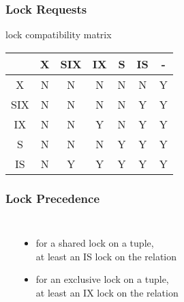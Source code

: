 \documentclass[dvipsnames]{beamer}
\theoremstyle{plain}
\begin{document}
\begin{frame}
  \frametitle{Lock Requests}

  \begin{block}{lock compatibility matrix}
    \begin{table}
      \begin{tabular}{|c||c|c|c|c|c|c|}\hline
    & X & SIX & IX & S & IS & -\\\hline\hline
  X & N &  N  & N  & N & N  & Y\\\hline
SIX & N &  N  & N  & N & Y  & Y\\\hline
 IX & N &  N  & Y  & N & Y  & Y\\\hline
  S & N &  N  & N  & Y & Y  & Y\\\hline
 IS & N &  Y  & Y  & Y & Y  & Y\\\hline
      \end{tabular}
    \end{table}
  \end{block}
\end{frame}

\begin{frame}
  \frametitle{Lock Precedence}

  \begin{columns}[t]
    \begin{center}
    \end{center}

    \pause
    \begin{itemize}
      \item for a shared lock on a tuple,\\
	at least an IS lock on the relation
      \item for an exclusive lock on a tuple,\\
	at least an IX lock on the relation
    \end{itemize}
  \end{columns}
\end{frame}
\end{document}
